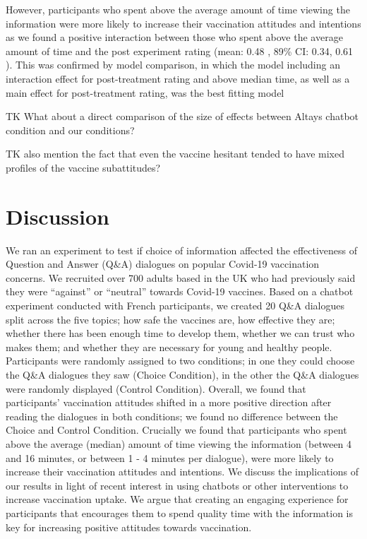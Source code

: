 \documentclass[
  english,
  ,jou,floatsintext]{apa6}
\begin{document}
However, participants who spent above the average amount of time viewing the information were more likely to increase their vaccination attitudes and intentions as we found a positive interaction between those who spent above the average amount of time and the post experiment rating (mean: 0.48 , 89\% CI: 0.34, 0.61 ). This was confirmed by model comparison, in which the model including an interaction effect for post-treatment rating and above median time, as well as a main effect for post-treatment rating, was the best fitting model

TK What about a direct comparison of the size of effects between Altays chatbot condition and our conditions?

TK also mention the fact that even the vaccine hesitant tended to have mixed profiles of the vaccine subattitudes?

\hypertarget{discussion}{%
\section{Discussion}\label{discussion}}

We ran an experiment to test if choice of information affected the effectiveness of Question and Answer (Q\&A) dialogues on popular Covid-19 vaccination concerns. We recruited over 700 adults based in the UK who had previously said they were ``against'' or ``neutral'' towards Covid-19 vaccines. Based on a chatbot experiment conducted with French participants, we created 20 Q\&A dialogues split across the five topics; how safe the vaccines are, how effective they are; whether there has been enough time to develop them, whether we can trust who makes them; and whether they are necessary for young and healthy people. Participants were randomly assigned to two conditions; in one they could choose the Q\&A dialogues they saw (Choice Condition), in the other the Q\&A dialogues were randomly displayed (Control Condition). Overall, we found that participants' vaccination attitudes shifted in a more positive direction after reading the dialogues in both conditions; we found no difference between the Choice and Control Condition. Crucially we found that participants who spent above the average (median) amount of time viewing the information (between 4 and 16 minutes, or between 1 - 4 minutes per dialogue), were more likely to increase their vaccination attitudes and intentions. We discuss the implications of our results in light of recent interest in using chatbots or other interventions to increase vaccination uptake. We argue that creating an engaging experience for participants that encourages them to spend quality time with the information is key for increasing positive attitudes towards vaccination.
\end{document}
